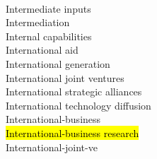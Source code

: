 \documentclass[a4paper]{article}
\begin{document}
\begin{multicols*}{2}
\begin{footnotesize}
\\ Intermediate inputs \\ Intermediation \\ Internal capabilities \\ International aid \\ International generation \\ International joint ventures \\ International strategic alliances \\ International technology diffusion \\ International-business \\ \hl{International-business research} \\ International-joint-ve
\end{footnotesize}
\end{multicols*}
\end{document}
